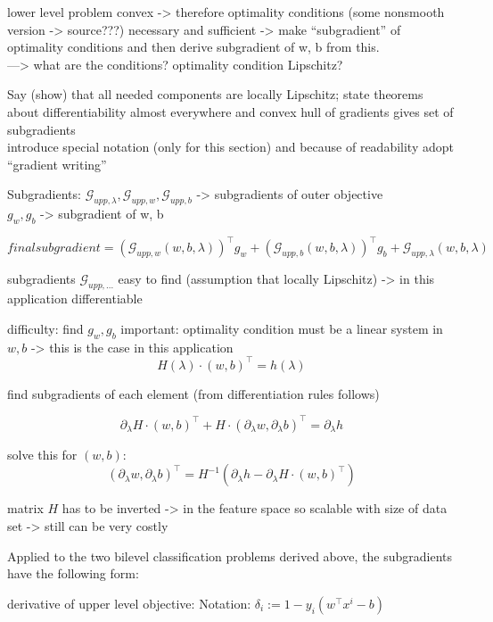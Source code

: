 lower level problem convex -> therefore optimality conditions (some nonsmooth version -> source???) necessary and sufficient -> make ``subgradient'' of optimality conditions and then derive subgradient of w, b from this. \\
---> what are the conditions? optimality condition Lipschitz? 

Say (show) that all needed components are locally Lipschitz; state theorems about differentiability almost everywhere and convex hull of gradients gives set of subgradients\\
introduce special notation (only for this section) and because of readability adopt ``gradient writing''

Subgradients:
\(\mathcal{G}_{upp,\lambda}, \mathcal{G}_{upp,w},\mathcal{G}_{upp,b}\) -> subgradients of outer objective \\
\(g_w, g_b\) -> subgradient of w, b

\[ final subgradient = \left(\mathcal{G}_{upp,w}(w,b,\lambda)\right)^{\top}g_w+\left(\mathcal{G}_{upp,b}(w,b,\lambda)\right)^{\top}g_b+\mathcal{G}_{upp,\lambda}(w,b,\lambda) 
\label{subgr_upp}\]

subgradients \(\mathcal{G}_{upp,...}\) easy to find (assumption that locally Lipschitz) -> in this application differentiable

difficulty: find \(g_w, g_b\)
important: optimality condition must be a linear system in \(w,b\) -> this is the case in this application
\[ H(\lambda)\cdot (w,b)^{\top} = h(\lambda) \]

find subgradients of each element (from differentiation rules follows)

\[ \partial_{\lambda} H\cdot (w,b)^{\top} + H \cdot(\partial_{\lambda} w, \partial_{\lambda} b)^{\top} = \partial_{\lambda} h  \]

solve this for \((w,b)\):
\[ (\partial_{\lambda} w, \partial_{\lambda}b)^{\top} = H^{-1}\left(\partial_{\lambda}h-\partial_{\lambda} H \cdot(w,b)^{\top}\right) \]

matrix \(H\) has to be inverted -> in the feature space so scalable with size of data set -> still can be very costly \cite{Moore2011}

Applied to the two bilevel classification problems derived above, the subgradients have the following form:

derivative of upper level objective:
Notation: \(\delta_i := 1-y_i(w^{\top}x^i-b)\)

